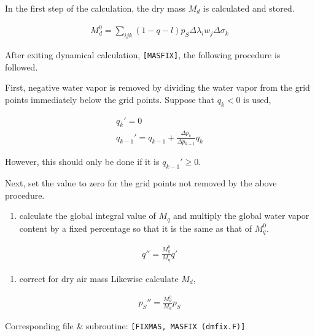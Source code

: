 In the first step of the calculation, the dry mass \(M_d\) is calculated
and stored.

\begin{eqnarray}
  M_d^0 = \sum_{ijk} (1-q-l) p_S \Delta\lambda_i w_j \Delta\sigma_k
\end{eqnarray}

After exiting dynamical calculation, \texttt{{[}MASFIX{]}}, the
following procedure is followed.

First, negative water vapor is removed by dividing the water vapor from
the grid points immediately below the grid points. Suppose that
\(q_k < 0\) is used,

\begin{eqnarray}
        q_k'      =  0          \\
        q_{k-1}'  =  q_{k-1} + \frac{\Delta p_k}{\Delta p_{k-1}} q_k
\end{eqnarray}

However, this should only be done if it is \(q_{k-1}' \ge 0\).

Next, set the value to zero for the grid points not removed by the above
procedure.

\begin{enumerate}
\def\labelenumi{\arabic{enumi}.}
\setcounter{enumi}{2}
\tightlist
\item
  calculate the global integral value of \(M_q\) and multiply the global
  water vapor content by a fixed percentage so that it is the same as
  that of \(M_q^0\).
\end{enumerate}

\begin{eqnarray}
        q'' = \frac{M_q^0}{M_q} q'
\end{eqnarray}

\begin{enumerate}
\def\labelenumi{\arabic{enumi}.}
\setcounter{enumi}{3}
\tightlist
\item
  correct for dry air mass Likewise calculate \(M_d\),
\end{enumerate}

\begin{eqnarray}
        p_S'' = \frac{M_d^0}{M_d} p_S
\end{eqnarray}

Corresponding file \& subroutine:
\texttt{{[}FIXMAS,\ MASFIX\ (dmfix.F){]}}
